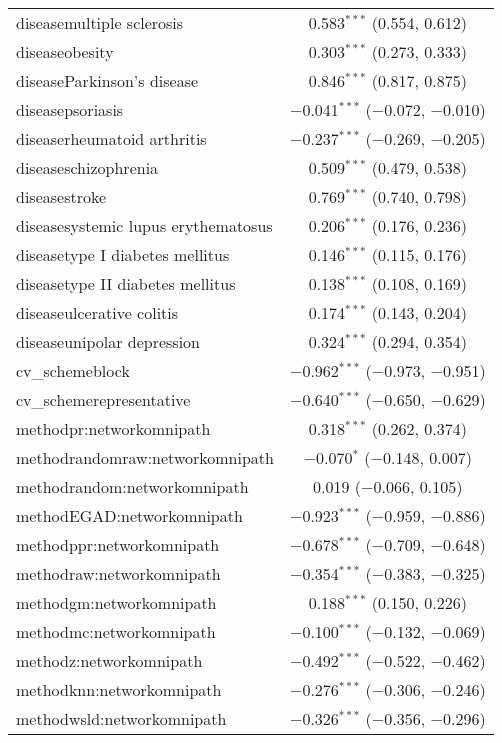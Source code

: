\begin{table}[!htbp]
\begin{tabular}{@{\extracolsep{5pt}}lc}
  diseasemultiple sclerosis & 0.583$^{***}$ (0.554, 0.612) \\ 
  diseaseobesity & 0.303$^{***}$ (0.273, 0.333) \\ 
  diseaseParkinson's disease & 0.846$^{***}$ (0.817, 0.875) \\ 
  diseasepsoriasis & $-$0.041$^{***}$ ($-$0.072, $-$0.010) \\ 
  diseaserheumatoid arthritis & $-$0.237$^{***}$ ($-$0.269, $-$0.205) \\ 
  diseaseschizophrenia & 0.509$^{***}$ (0.479, 0.538) \\ 
  diseasestroke & 0.769$^{***}$ (0.740, 0.798) \\ 
  diseasesystemic lupus erythematosus & 0.206$^{***}$ (0.176, 0.236) \\ 
  diseasetype I diabetes mellitus & 0.146$^{***}$ (0.115, 0.176) \\ 
  diseasetype II diabetes mellitus & 0.138$^{***}$ (0.108, 0.169) \\ 
  diseaseulcerative colitis & 0.174$^{***}$ (0.143, 0.204) \\ 
  diseaseunipolar depression & 0.324$^{***}$ (0.294, 0.354) \\ 
  cv\_schemeblock & $-$0.962$^{***}$ ($-$0.973, $-$0.951) \\ 
  cv\_schemerepresentative & $-$0.640$^{***}$ ($-$0.650, $-$0.629) \\ 
  methodpr:networkomnipath & 0.318$^{***}$ (0.262, 0.374) \\ 
  methodrandomraw:networkomnipath & $-$0.070$^{*}$ ($-$0.148, 0.007) \\ 
  methodrandom:networkomnipath & 0.019 ($-$0.066, 0.105) \\ 
  methodEGAD:networkomnipath & $-$0.923$^{***}$ ($-$0.959, $-$0.886) \\ 
  methodppr:networkomnipath & $-$0.678$^{***}$ ($-$0.709, $-$0.648) \\ 
  methodraw:networkomnipath & $-$0.354$^{***}$ ($-$0.383, $-$0.325) \\ 
  methodgm:networkomnipath & 0.188$^{***}$ (0.150, 0.226) \\ 
  methodmc:networkomnipath & $-$0.100$^{***}$ ($-$0.132, $-$0.069) \\ 
  methodz:networkomnipath & $-$0.492$^{***}$ ($-$0.522, $-$0.462) \\ 
  methodknn:networkomnipath & $-$0.276$^{***}$ ($-$0.306, $-$0.246) \\ 
  methodwsld:networkomnipath & $-$0.326$^{***}$ ($-$0.356, $-$0.296) \\ 

\end{tabular}
\end{table}
